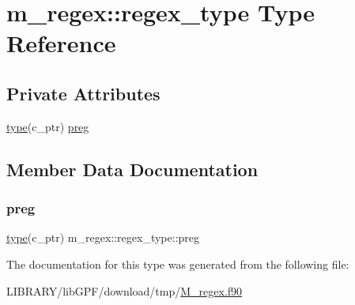 \hypertarget{structm__regex_1_1regex__type}{}\section{m\+\_\+regex\+:\+:regex\+\_\+type Type Reference}
\label{structm__regex_1_1regex__type}
\subsection*{Private Attributes}
\begin{DoxyCompactItemize}
\item 
\hyperlink{stop__watch_83_8txt_a70f0ead91c32e25323c03265aa302c1c}{type}(c\+\_\+ptr) \hyperlink{structm__regex_1_1regex__type_a850ec0fd2a7423bb33119ff8f95cb38c}{preg}
\end{DoxyCompactItemize}


\subsection{Member Data Documentation}
\mbox{\label{structm__regex_1_1regex__type_a850ec0fd2a7423bb33119ff8f95cb38c}} 
\subsubsection{\texorpdfstring{preg}{preg}}
{\footnotesize\ttfamily \hyperlink{stop__watch_83_8txt_a70f0ead91c32e25323c03265aa302c1c}{type}(c\+\_\+ptr) m\+\_\+regex\+::regex\+\_\+type\+::preg\hspace{0.3cm}{\ttfamily [private]}}



The documentation for this type was generated from the following file\+:\begin{DoxyCompactItemize}
\item 
L\+I\+B\+R\+A\+R\+Y/lib\+G\+P\+F/download/tmp/\hyperlink{M__regex_8f90}{M\+\_\+regex.\+f90}\end{DoxyCompactItemize}
